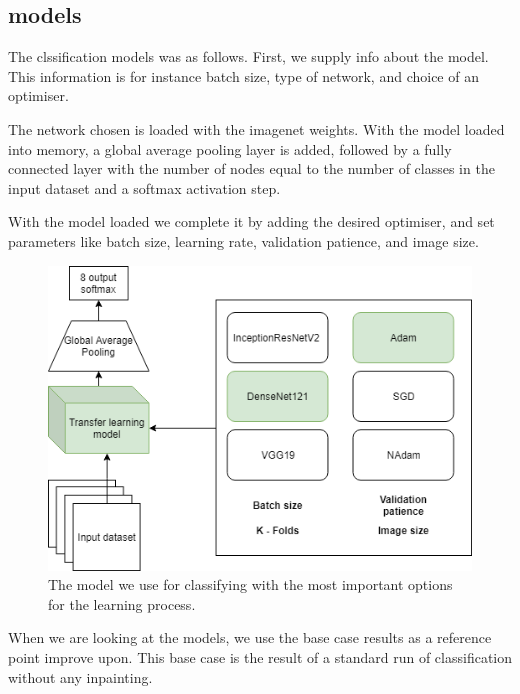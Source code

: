 \subsection{models}
The clssification models was as follows.
First, we supply info about the model. This information is for instance batch size, type of network, and choice of an optimiser. 

The network chosen is loaded with the imagenet weights. With the model loaded into memory, a global average pooling layer is added, followed by a fully connected layer with the number of nodes equal to the number of classes in the input dataset and a softmax activation step.

With the model loaded we complete it by adding the desired optimiser, and set parameters like batch size, learning rate, validation patience, and image size.

\begin{figure}[h!]
        \centering
        \includegraphics[scale=0.7]{experiments/figures/model.png}
        \caption{ The model we use for classifying with the most important options for the learning process. }
    \label{fig:KTLmodel}
\end{figure}


When we are looking at the models, we use the base case results as a reference point improve upon. This base case is the result of a standard run of classification without any inpainting.

